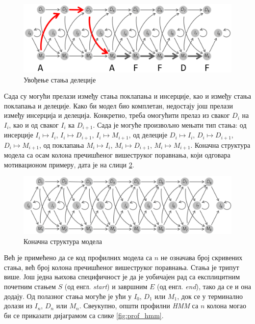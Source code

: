 \documentclass[12pt,oneside]{memoir}
\begin{document}
\begin{CJK}{UTF8}{ipxm}
\begin{figure}[H]
  \centering
  \includegraphics[width=\textwidth]{delecije2.png}
  \caption{Увођење стања делеције \cite{compeau2015}}
  \label{fig:delecije2}
\end{figure}

Сада су могући прелази између стања поклапања и инсерције, као и између стања поклапања и делеције. Како би модел био комплетан, недостају још прелази између инсерција и делеција. Конкретно, треба омогућити прелаз из сваког $D_i$ на $I_i$, као и од сваког $I_i$ ка $D_{i+1}$. Сада је могуће произвољно мењати тип стања: од инсерције $I_i \mapsto I_i$, $I_i \mapsto D_{i+1}$, $I_i \mapsto M_{i+1}$, од делеције $D_i \mapsto I_i$, $D_i \mapsto D_{i+1}$, $D_i \mapsto M_{i+1}$, од поклапања $M_i \mapsto I_i$, $M_i \mapsto D_{i+1}$, $M_i \mapsto M_{i+1}$. Коначна структура модела са осам колона пречишћеног вишеструког поравнања, који одговара мотивационом примеру, дата је на слици \ref{fig:indeli}.

\begin{figure}[H]
  \centering
  \includegraphics[width=\textwidth]{indeli.png}
  \caption{Коначна структура модела \cite{compeau2015}}
  \label{fig:indeli}
\end{figure}

Већ је примећено да се код профилних модела са $n$ не означава број скривених стања, већ број колона пречишћеног вишеструког поравнања. Стања је трипут више. Још једна њихова специфичност је да је уобичајен рад са експлицитним почетним стањем $S$ (од енгл. \textit{start}) и завршним $E$ (од енгл. \textit{end}), тако да се и она додају. Од полазног стања могуће је ући у $I_0$, $D_1$ или $M_1$, док се у терминално долази из $I_n$, $D_n$ или $M_n$. Свеукупно, општи профилни \textit{HMM} са $n$ колона могао би се приказати дијаграмом са слике \ref{fig:prof_hmm}.


\end{CJK}
\end{document}
